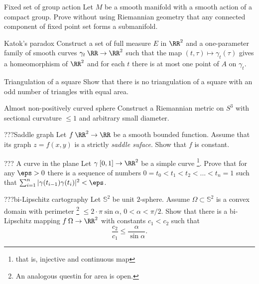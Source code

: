 \begin{pr}{}{Fixed set of group action} Let $M$ be a smooth manifold with a smooth action of a compact group.
Prove without using Riemannian geometry that any connected component of fixed point set forms a submanifold.
\end{pr}

\begin{pr}{\hard}{Katok's paradox}
Construct a set of full measure $E$ in $\RR^2$ and a one-parameter family of smooth curves $\gamma_t\:\RR\to\RR^2$ such that the map $(t,\tau)\mapsto\gamma_t(\tau)$ gives a homeomorphism of $\RR^2$ and for each $t$ there is at most one point of $A$ on $\gamma_t$.
\end{pr}

\begin{pr}{\hard}{Triangulation of a square} 
Show that there is no triangulation of a square with an odd number of triangles with equal area.
\end{pr}

\begin{pr}{\hard}{Almost non-positively curved sphere}  Construct a Riemannian metric on $S^3$ with sectional curvature $\le 1$ and arbitrary small diameter.
\end{pr}

\begin{pr}{}{???Saddle graph}
Let $f\:\RR^2\to\RR$ be a smooth bounded function.
Assume that its graph $z=f(x,y)$ is a strictly \emph{saddle suface}.
Show that $f$ is constant. 
\end{pr}

\begin{pr}{}{??? A curve in the plane}
Let $\gamma\:[0,1]\to \RR^2$ be a simple curve%
\footnote{that is, injective and continuous map}.
Prove that for any $\eps>0$ there is a sequence of numbers
$0=t_0<t_1<t_2<...<t_n=1$ such that
$\sum_{i=1}^n|\gamma(t_{i-1})\gamma(t_{i})|^2<\eps$.
\end{pr}


\begin{pr}{}{???bi-Lipschitz cartography} Let $\mathbb{S}^2$ be unit $2$-sphere.
Assume $\Omega\subset \mathbb{S}^2$ is a convex domain with perimeter%
\footnote{An analogous questin for area is open.}
$\le 2\cdot\pi\sin\alpha$, $0<\alpha<\pi/2$.
Show that there is a bi-Lipschitz mapping $f\:\Omega\to \RR^2$
with constants $c_1 < c_2$ such that
$$\frac{c_2}{c_1}\le \frac{\alpha}{\sin\alpha}.$$
\end{pr}


